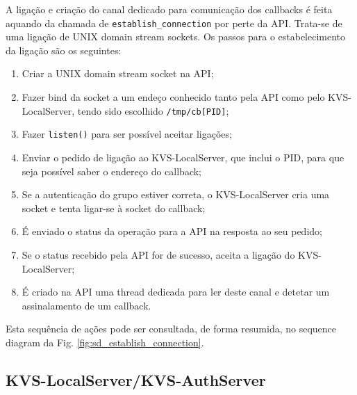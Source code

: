 A ligação e criação do canal dedicado para comunicação dos callbacks é feita aquando da chamada de \texttt{establish\_connection} por perte da API. Trata-se de uma ligação de UNIX domain stream sockets. Os passos para o estabelecimento da ligação são os seguintes:
\begin{enumerate}[noitemsep]
    \item Criar a UNIX domain stream socket na API;
    \item Fazer bind da socket a um endeço conhecido tanto pela API como pelo KVS-LocalServer, tendo sido escolhido \texttt{/tmp/cb[PID]};
    \item Fazer \texttt{listen()} para ser possível aceitar ligações;
    \item Enviar o pedido de ligação ao KVS-LocalServer, que inclui o PID, para que seja possível saber o endereço do callback;
    \item Se a autenticação do grupo estiver correta, o KVS-LocalServer cria uma socket e tenta ligar-se à socket do callback;
    \item É enviado o status da operação para a API na resposta ao seu pedido;
    \item Se o status recebido pela API for de sucesso, aceita a ligação do KVS-LocalServer;
    \item É criado na API uma thread dedicada para ler deste canal e detetar um assinalamento de um callback.
\end{enumerate}
Esta sequência de ações pode ser consultada, de forma resumida, no sequence diagram da Fig. \ref{fig:sd_establish_connection}.



\subsection{KVS-LocalServer/KVS-AuthServer} \label{sec:com_local_auth}


